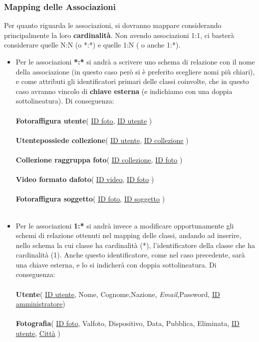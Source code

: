 \documentclass[a4paper]{article}
\begin{document}
		\subsubsection{Mapping delle Associazioni}
		\vspace{5pt}
		Per quanto riguarda le associazioni, si dovranno
		mappare considerando principalmente la loro
		\textbf{cardinalità}. Non avendo associazioni 1:1, ci
		basterà considerare quelle N:N (o *:*) e quelle 1:N
		( o anche 1:*).

		\begin{itemize}
		\item Per le associazioni \textbf{*:*} si andrà a
		scrivere uno
		schema di relazione con il nome
		della associazione (in questo caso però si è
		preferito scegliere nomi più chiari), e come
		attributi gli identificatori primari delle classi
		coinvolte, che in questo caso avranno vincolo di
		\textbf{chiave esterna} (e indichiamo con una
		doppia sottolineatura). Di conseguenza:
		\\\\
		\textbf{Foto\textunderscore raffigura\textunderscore
		utente}( \underline{\underline{ID foto}},
		\underline{\underline{ID utente}} )
		\\\\
		\textbf{Utente\textunderscore possiede\textunderscore
		collezione}( \underline{\underline{ID utente}},
		\underline{\underline{ID collezione}} )
		\\\\	
		\textbf{Collezione\textunderscore
		raggruppa\textunderscore
		foto}( \underline{\underline{ID collezione}},
		\underline{\underline{ID foto}} )
		\\\\
		\textbf{Video\textunderscore
		formato\textunderscore
		da\textunderscore foto}( \underline{\underline{ID
		video}},
		\underline{\underline{ID foto}} )
		\\\\
		\textbf{Foto\textunderscore raffigura\textunderscore
		soggetto}( \underline{\underline{ID foto}},
		\underline{\underline{ID soggetto}} )
		\\\\
		
		\item Per le associazioni \textbf{1:*} si andrà 
		invece a
		modificare opportunamente gli schemi di relazione
		ottenuti nel mapping delle classi, andando ad
		inserire, nello schema la cui classe ha cardinalità
		(*), l'identificatore della classe che ha cardinalità
		(1). Anche questo identificatore, come nel caso
		precedente, sarà una chiave esterna, e lo si
		indicherà
		con doppia sottolineatura. Di conseguenza:
		\\\\
		\textbf{Utente}( \underline{ID utente}, Nome,
		Cognome,Nazione, \emph{Email},Password,
		\underline{\underline{ID amministratore}})
		\\\\		
		\textbf{Fotografia}( \underline{ID foto}, 
		Val\textunderscore foto, Dispositivo, Data, Pubblica,
		Eliminata, \underline{\underline{ID utente}},
		\underline{\underline{Città}} )
		\end{itemize}	
		
\end{document}
